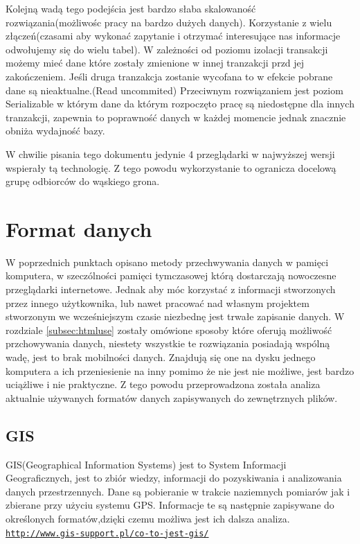 Kolejną wadą tego podejścia jest bardzo słaba skalowaność rozwiązania(możliwośc pracy na bardzo dużych danych). Korzystanie z wielu złączeń(czasami aby wykonać zapytanie i otrzymać interesujące nas informacje odwołujemy się do wielu tabel).
W zależności od poziomu izolacji transakcji możemy mieć dane które zostały zmienione w innej tranzakcji przd jej zakończeniem. Jeśli druga tranzakcja zostanie wycofana to w efekcie pobrane dane są nieaktualne.(Read uncommited)
Przeciwnym rozwiązaniem jest poziom Serializable w którym dane da którym rozpoczęto pracę są niedostępne dla innych tranzakcji, zapewnia to poprawność danych w każdej momencie jednak znacznie obniża wydajność bazy.


W chwilie pisania tego dokumentu jedynie 4 przeglądarki w najwyższej wersji wspierały tą technologię. Z tego powodu wykorzystanie to ogranicza docelową grupę odbiorców do wąskiego grona.

\section{Format danych}
\label{sec:dataformat}

W poprzednich punktach opisano metody przechwywania danych w pamięci komputera, w szeczólności pamięci tymczasowej którą dostarczają nowoczesne przeglądarki internetowe. Jednak aby móc korzystać z informacji stworzonych przez innego użytkownika, lub nawet pracować nad własnym projektem stworzonym we wcześniejszym czasie niezbednę jest trwałe zapisanie danych. W rozdziale \ref{subsec:htmluse} zostały omówione sposoby które oferują możliwość przchowywania danych, niestety wszystkie te rozwiązania posiadają wspólną wadę, jest to brak mobilności danych. Znajdują się one na dysku jednego komputera a ich przeniesienie na inny pomimo że nie jest nie możliwe, jest bardzo uciążliwe i nie praktyczne. Z tego powodu przeprowadzona została analiza aktualnie używanych formatów danych zapisywanych do zewnętrznych plików.

\subsection{GIS}
\label{subsec:gis}

GIS(Geographical Information Systems) jest to System Informacji Geograficznych, jest to zbiór wiedzy, informacji do pozyskiwania i analizowania danych przestrzennych. Dane są pobieranie w trakcie naziemnych pomiarów jak i zbierane przy użyciu systemu GPS. Informacje te są następnie zapisywane do określonych formatów,dzięki czemu możliwa jest ich dalsza analiza. \underline{\texttt{http://www.gis-support.pl/co-to-jest-gis/}}


